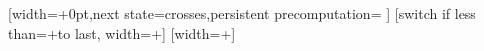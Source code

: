 {%
  [width=+0pt,next state=crosses,persistent precomputation={
    \edef\pgf@lib@dec@ssw{\pgfmathresult pt}
    \edef\pgf@lib@dec@ssh{\pgfmathresult pt}
  }]{}%
  [switch if less than=+\pgfdecorationsegmentlength to last,
                  width=+\pgfdecorationsegmentlength]
  {
    \pgfpathmoveto{\pgfqpoint{-\pgf@lib@dec@ssw}{\pgf@lib@dec@ssh}}
    \pgfpathlineto{\pgfqpoint{\pgf@lib@dec@ssw}{-\pgf@lib@dec@ssh}}
    \pgfpathmoveto{\pgfqpoint{-\pgf@lib@dec@ssw}{-\pgf@lib@dec@ssh}}
    \pgfpathlineto{\pgfqpoint{\pgf@lib@dec@ssw}{\pgf@lib@dec@ssh}}
  }%
  [width=+\pgfdecoratedremainingdistance]
  {
    \pgfpathmoveto{\pgfqpoint{-\pgf@lib@dec@ssw}{\pgf@lib@dec@ssh}}
    \pgfpathlineto{\pgfqpoint{\pgf@lib@dec@ssw}{-\pgf@lib@dec@ssh}}
    \pgfpathmoveto{\pgfqpoint{-\pgf@lib@dec@ssw}{-\pgf@lib@dec@ssh}}
    \pgfpathlineto{\pgfqpoint{\pgf@lib@dec@ssw}{\pgf@lib@dec@ssh}}
  }%
}%







\newif\ifpgf@lib@shapedecoration@betweenborders

\edef\pgf@lib@shapedecoration@initialise{0pt}%

